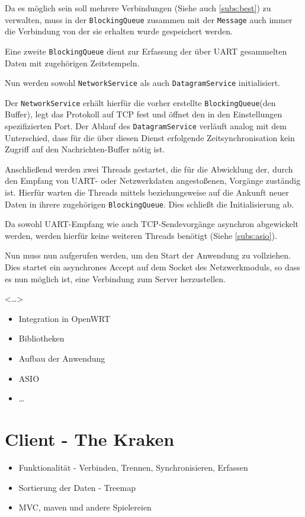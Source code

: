 Da es möglich sein soll mehrere Verbindungen (Siehe auch \autoref{subs:best}) zu
verwalten, muss in der \texttt{BlockingQueue} zusammen mit der \texttt{Message}
auch immer die Verbindung von der sie erhalten wurde gespeichert werden.

Eine zweite \texttt{BlockingQueue} dient zur Erfassung der über UART gesammelten
Daten mit zugehörigen Zeitstempeln. 

Nun werden sowohl \texttt{NetworkService} als auch \texttt{DatagramService}
initialisiert.

Der \texttt{NetworkService} erhält hierfür die vorher erstellte
\texttt{BlockingQueue}(den Buffer), legt das Protokoll auf TCP fest und
öffnet den in den Einstellungen spezifizierten Port. Der Ablauf des
\texttt{DatagramService} verläuft analog mit dem Unterschied, dass für die über
diesen Dienst erfolgende Zeitsynchronisation kein Zugriff auf den
Nachrichten-Buffer nötig ist.

Anschließend werden zwei Threads gestartet, die für die Abwicklung der, durch
den Empfang von UART- oder Netzwerkdaten angestoßenen, Vorgänge zuständig
ist. Hierfür warten die Threads mittels  beziehungsweise \newline{} auf die Ankunft neuer Daten in ihrere zugehörigen
\texttt{BlockingQueue}. Dies schließt die Initialisierung ab.

Da sowohl UART-Empfang wie auch TCP-Sendevorgänge asynchron
abgewickelt werden, werden hierfür keine weiteren Threads benötigt (Siehe
\autoref{subs:asio}). 

Nun muss nun  aufgerufen werden, um den Start der
Anwendung zu vollziehen. Dies startet ein asynchrones Accept auf dem Socket des
Netzwerkmoduls, so dass es nun möglich ist, eine Verbindung zum Server
herzustellen.

<\ldots>



\begin{itemize}
  \item Integration in OpenWRT
  \item Bibliotheken
  \item Aufbau der Anwendung
  \item ASIO
  \item \ldots
\end{itemize}
\section{Client - The Kraken}
\begin{itemize}
  \item Funktionalität - Verbinden, Trennen, Synchronisieren, Erfassen
  \item Sortierung der Daten - Treemap
  \item MVC, maven und andere Spielereien
\end{itemize}
